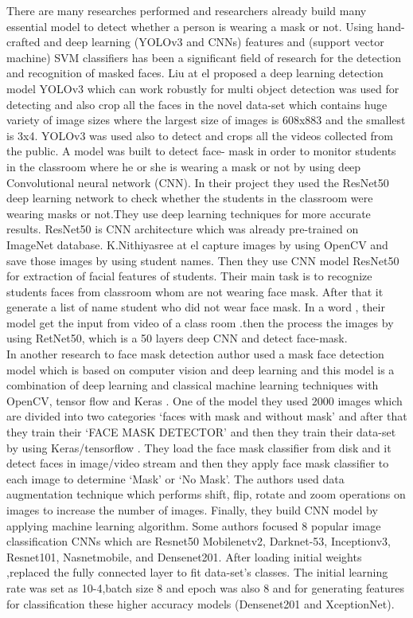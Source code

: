 \documentclass[conference]{IEEEtran}
\begin{document}
There are many researches performed and researchers already build many essential model to detect whether a person is wearing a mask or not. Using hand-crafted and deep learning (YOLOv3 and CNNs) features and (support vector machine) SVM classifiers has been a significant field of research for the detection and recognition of masked faces\cite{A2}. Liu at el \cite{A2} proposed a deep learning detection model YOLOv3 which can work robustly for  multi object detection was used for detecting and also crop all the faces in the novel data-set which contains huge variety of image sizes where the largest size of images is 608x883 and the smallest is 3x4. YOLOv3 was used also to detect and  crops all the videos collected from the public. A model was built to detect face- mask in order to monitor students in the classroom where he or she is wearing a mask or not by using deep Convolutional neural network (CNN)\cite{E1}. In their project they used the ResNet50 deep learning network to check whether the students in the classroom were wearing masks or not.They use deep learning techniques for more accurate
results\cite{E1}. ResNet50 is CNN architecture which was already pre-trained on ImageNet database. K.Nithiyasree at el \cite{E1} capture images by using OpenCV and save those images by using
student names. Then they use CNN model ResNet50 for extraction of facial features of students. Their main task is to recognize students faces from classroom whom are not wearing face mask. After that it generate a list of name student who did not wear face mask. In a word , their model get the input from video of a class room .then the process the images by using RetNet50, which is a 50 layers deep CNN and detect face-mask.\\

In another research to face mask detection author used a mask face detection model which is based on computer vision and deep learning and this model is a combination of deep learning and classical machine learning techniques with OpenCV\cite{adusumalli2021face}, tensor flow and Keras \cite{E2}\cite{suresh2021face}. One of the model they used 2000 images which are divided into two categories ‘faces with mask and without mask’ and after that 
they train their ‘FACE MASK DETECTOR’ and then they train their data-set by using
Keras/tensorflow \cite{E2}. They load the face mask classifier from disk and it detect faces in image/video stream and then they apply face mask classifier to each image to determine ‘Mask’ or ‘No Mask’\cite{E2}. The authors used data augmentation technique which  performs shift, flip, rotate and zoom operations on images to increase the number of images\cite{E2}. Finally, they build CNN model by applying machine learning algorithm. Some authors focused 8 popular image classification CNNs which are Resnet50 Mobilenetv2, Darknet-53, Inceptionv3, Resnet101, Nasnetmobile,  and Densenet201\cite{A2}. After loading  initial weights ,replaced the fully connected layer to fit data-set’s classes. The initial learning rate was set as 10-4,batch size 8 and epoch was also 8 and for generating features for classification these higher accuracy models (Densenet201 and XceptionNet)\cite{A2}. 
\end{document}
